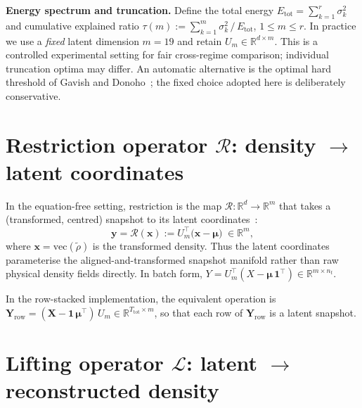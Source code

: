 \noindent\textbf{Energy spectrum and truncation.}
\label{subsec:energy_truncation}
Define the total energy $E_{\mathrm{tot}}=\sum_{k=1}^r\sigma_k^2$ and
cumulative explained ratio
$\tau(m) := \sum_{k=1}^{m}\sigma_k^2\,/\,E_{\mathrm{tot}}$,
$1\le m\le r$.
In practice we use a \emph{fixed} latent dimension $m=19$
and retain $U_m\in\mathbb{R}^{d\times m}$.
This is a controlled experimental setting for fair cross-regime
comparison; individual truncation optima may differ.  An automatic alternative is the optimal hard threshold of Gavish and Donoho~\cite{gavish2014svht}; the fixed choice adopted here is deliberately conservative.

\section{Restriction operator \texorpdfstring{$\mathcal{R}$}{R}:
  density \texorpdfstring{$\to$}{to} latent coordinates}
\label{sec:restriction}

In the equation-free setting, restriction is the map
$\mathcal{R}:\mathbb{R}^d\to\mathbb{R}^m$ that takes a (transformed,
centred) snapshot to its latent
coordinates~\cite{alvarez2025eqfree}:
\begin{equation}
  \mathbf{y} = \mathcal{R}(\mathbf{x})
  := U_m^\top\bigl(\mathbf{x}-\boldsymbol{\mu}\bigr)
  \;\in\mathbb{R}^m,
  \label{eq:restriction}
\end{equation}
where $\mathbf{x}=\mathrm{vec}(\tilde\rho)$ is the transformed density.
Thus the latent coordinates parameterise the aligned-and-transformed
snapshot manifold rather than raw physical density fields directly.
In batch form,
$Y = U_m^\top(X - \boldsymbol{\mu}\,\mathbf{1}^\top)
\in\mathbb{R}^{m\times n_t}$.

In the row-stacked implementation, the equivalent
operation is
$\mathbf{Y}_{\mathrm{row}} = (\mathbf{X}-\mathbf{1}\,\boldsymbol{\mu}^\top)\,U_m
\in\mathbb{R}^{T_{\mathrm{tot}}\times m}$,
so that each row of $\mathbf{Y}_{\mathrm{row}}$ is a latent snapshot.

\section{Lifting operator \texorpdfstring{$\mathcal{L}$}{L}:
  latent \texorpdfstring{$\to$}{to} reconstructed density}
\label{sec:lifting}

